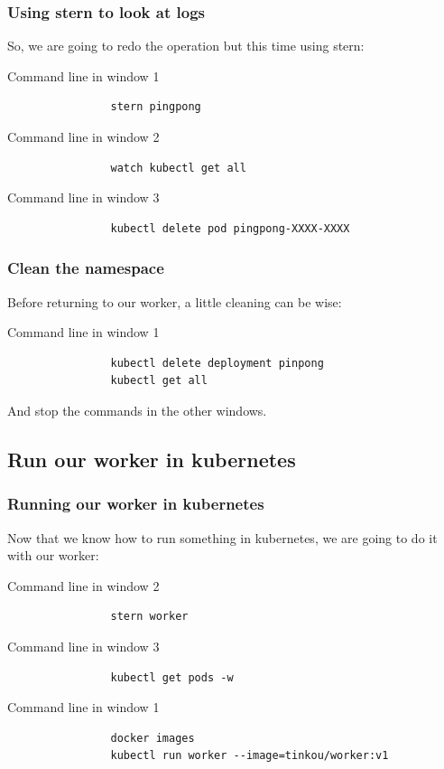 	\begin{frame}[fragile]
		\frametitle{Using stern to look at logs}

		So, we are going to redo the operation but this time using stern:
		\begin{block}{Command line in window 1}
			\begin{verbatim}
				stern pingpong
			\end{verbatim}
		\end{block}
				\begin{block}{Command line in window 2}
			\begin{verbatim}
				watch kubectl get all
			\end{verbatim}
		\end{block}
		\begin{block}{Command line in window 3}
			\begin{verbatim}
				kubectl delete pod pingpong-XXXX-XXXX
			\end{verbatim}
		\end{block}
	\end{frame}
	
	\begin{frame}[fragile]
		\frametitle{Clean the namespace}
		
		Before returning to our worker, a little cleaning can be wise:
		\begin{block}{Command line in window 1}
			\begin{verbatim}
				kubectl delete deployment pinpong
				kubectl get all
			\end{verbatim}
		\end{block}
		
		\medskip
		
		And stop the commands in the other windows.
	\end{frame}
	
\subsection{Run our worker in kubernetes}

	\begin{frame}[fragile]
		\frametitle{Running our worker in kubernetes}
		
		Now that we know how to run something in kubernetes, we are going to do it with our worker:
		\begin{block}{Command line in window 2}
			\begin{verbatim}
				stern worker
			\end{verbatim}
		\end{block}		
		\begin{block}{Command line in window 3}
			\begin{verbatim}
				kubectl get pods -w
			\end{verbatim}
		\end{block}
		\begin{block}{Command line in window 1}
			\begin{verbatim}
				docker images
				kubectl run worker --image=tinkou/worker:v1
			\end{verbatim}
		\end{block}
	\end{frame}
	
